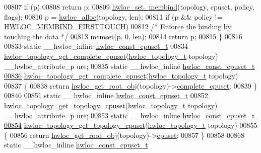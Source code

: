 \begin{DoxyCode}
00807   \textcolor{keywordflow}{if} (p)
00808     \textcolor{keywordflow}{return} p;
00809   \hyperlink{a00050_ga8b6d1d90227aff8e44ef26bc1f8a8f95}{hwloc_set_membind}(topology, cpuset, policy, flags);
00810   p = \hyperlink{a00050_gac5586e58cf25c3596b7d4aa31ce13259}{hwloc_alloc}(topology, len);
00811   \textcolor{keywordflow}{if} (p && policy != \hyperlink{a00050_ggac9764f79505775d06407b40f5e4661e8a979c7aa78dd32780858f30f47a72cca0}{HWLOC_MEMBIND_FIRSTTOUCH})
00812     \textcolor{comment}{/* Enforce the binding by touching the data */}
00813     memset(p, 0, len);
00814   \textcolor{keywordflow}{return} p;
00815 \}
00816 
00833 \textcolor{keyword}{static} \_\_hwloc\_inline \hyperlink{a00040_ga1f784433e9b606261f62d1134f6a3b25}{hwloc_const_cpuset_t}
00834 \hyperlink{a00060_ga418ebb39eaf1eac8f9cf4047cf59a534}{hwloc_topology_get_complete_cpuset}(\hyperlink{a00039_ga9d1e76ee15a7dee158b786c30b6a6e38}{hwloc_topology_t} topology) \_\_hwloc\_attribute\_p
      ure;
00835 \textcolor{keyword}{static} \_\_hwloc\_inline \hyperlink{a00040_ga1f784433e9b606261f62d1134f6a3b25}{hwloc_const_cpuset_t}
\hypertarget{a00031_source_l00836}{}\hyperlink{a00060_ga418ebb39eaf1eac8f9cf4047cf59a534}{00836} \hyperlink{a00060_ga418ebb39eaf1eac8f9cf4047cf59a534}{hwloc_topology_get_complete_cpuset}(\hyperlink{a00039_ga9d1e76ee15a7dee158b786c30b6a6e38}{hwloc_topology_t} topology)
00837 \{
00838   \textcolor{keywordflow}{return} \hyperlink{a00053_gadbf58f6e187efbdb3cd9a8e30311b7d7}{hwloc_get_root_obj}(topology)->\hyperlink{a00016_a91788a9da687beb7224cc1fd7b75208c}{complete_cpuset};
00839 \}
00840 
00851 \textcolor{keyword}{static} \_\_hwloc\_inline \hyperlink{a00040_ga1f784433e9b606261f62d1134f6a3b25}{hwloc_const_cpuset_t}
00852 \hyperlink{a00060_gaa319133e702fea664750c45735ac8a25}{hwloc_topology_get_topology_cpuset}(\hyperlink{a00039_ga9d1e76ee15a7dee158b786c30b6a6e38}{hwloc_topology_t} topology) \_\_hwloc\_attribute\_p
      ure;
00853 \textcolor{keyword}{static} \_\_hwloc\_inline \hyperlink{a00040_ga1f784433e9b606261f62d1134f6a3b25}{hwloc_const_cpuset_t}
\hypertarget{a00031_source_l00854}{}\hyperlink{a00060_gaa319133e702fea664750c45735ac8a25}{00854} \hyperlink{a00060_gaa319133e702fea664750c45735ac8a25}{hwloc_topology_get_topology_cpuset}(\hyperlink{a00039_ga9d1e76ee15a7dee158b786c30b6a6e38}{hwloc_topology_t} topology)
00855 \{
00856   \textcolor{keywordflow}{return} \hyperlink{a00053_gadbf58f6e187efbdb3cd9a8e30311b7d7}{hwloc_get_root_obj}(topology)->\hyperlink{a00016_a67925e0f2c47f50408fbdb9bddd0790f}{cpuset};
00857 \}
00858 
00868 \textcolor{keyword}{static} \_\_hwloc\_inline \hyperlink{a00040_ga1f784433e9b606261f62d1134f6a3b25}{hwloc_const_cpuset_t}

\end{DoxyCode}
